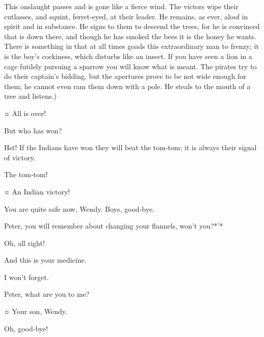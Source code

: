 \begin{drama}
\begin{stagedir}
This onslaught passes and is gone like a fierce wind.
The victors wipe their cutlasses, and squint, ferret‐eyed, at their leader.
He remains, as ever, aloof in spirit and in substance.
He signs to them to descend the trees, for he is convinced that \pan is down there,
and though he has smoked the bees it is the honey he wants.
There is something in \peter that at all times goads this extraordinary man to frenzy;
it is the boy’s cockiness, which disturbs \hook like an insect.
If you have seen a lion in a cage futilely pursuing a sparrow you will know what is meant.
The pirates try to do their captain’s bidding, but the apertures prove to be not wide enough for them;
he cannot even ram them down with a pole.
He steals to the mouth of a tree and listens.)
\end{stagedir}

\peterspeaks {}¤
All is over!

\wendyspeaks
But who has won?

\peterspeaks
Hst!
If the Indians have won they will beat the tom‐tom; it is always their signal of victory.


\tootlesspeaks
The tom‐tom!

\peterspeaks {}¤
An Indian victory!


\speakercontinues
You are quite safe now, Wendy.
Boys, good‐bye.

\wendyspeaks
Peter, you will remember about changing your flannels, won’t you?*'*

\peterspeaks
Oh, all right!

\wendyspeaks
And this is your medicine.


\peterspeaks
I won’t forget.

\wendyspeaks
Peter, what are you to me?

\peterspeaks {}¤
Your son, Wendy.

\wendyspeaks
Oh, good‐bye!

\end{drama}
